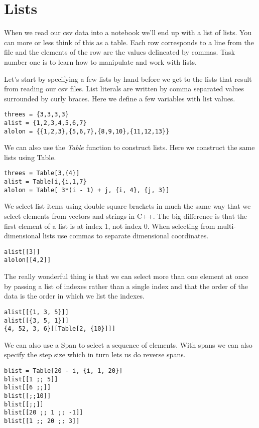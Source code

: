 \documentclass[]{tufte-handout}
\begin{document}
\section{Lists}

When we read our csv data into a notebook we'll end up with a list of lists. You can more or less think of this as a table. Each row corresponds to a line from the file and the elements of the row are the values delineated by commas. Task number one is to learn how to manipulate and work with lists. 

Let's start by specifying a few lists by hand before we get to the lists that result from reading our csv files. List literals are written by comma separated values surrounded by curly braces. Here we define a few variables with list values.
\begin{verbatim}
threes = {3,3,3,3}
alist = {1,2,3,4,5,6,7}
alolon = {{1,2,3},{5,6,7},{8,9,10},{11,12,13}}
\end{verbatim}
We can also use the \textit{Table} function to construct lists. Here we construct the same lists using Table.
\begin{verbatim}
threes = Table[3,{4}]
alist = Table[i,{i,1,7}
alolon = Table[ 3*(i - 1) + j, {i, 4}, {j, 3}]
\end{verbatim}

We select list items using double square brackets in much the same way that we select elements from vectors and strings in C++. The big difference is that the first element of a list is at index 1, not index 0. When selecting from multi-dimensional lists use commas to separate dimensional coordinates.
\begin{verbatim}
alist[[3]]
alolon[[4,2]]
\end{verbatim}  
The really wonderful thing is that we can select more than one element at once by passing a list of indexes rather than a single index and that the order of the data is the order in which we list the indexes. 
\begin{verbatim}
alist[[{1, 3, 5}]]
alist[[{3, 5, 1}]]
{4, 52, 3, 6}[[Table[2, {10}]]]
\end{verbatim}
We can also use a Span to select a sequence of elements. With spans we can also specify the step size which in turn lets us do reverse spans. 
\begin{verbatim}
blist = Table[20 - i, {i, 1, 20}]
blist[[1 ;; 5]]
blist[[6 ;;]]
blist[[;;10]]
blist[[;;]]
blist[[20 ;; 1 ;; -1]]
blist[[1 ;; 20 ;; 3]]
\end{verbatim}
\end{document}

